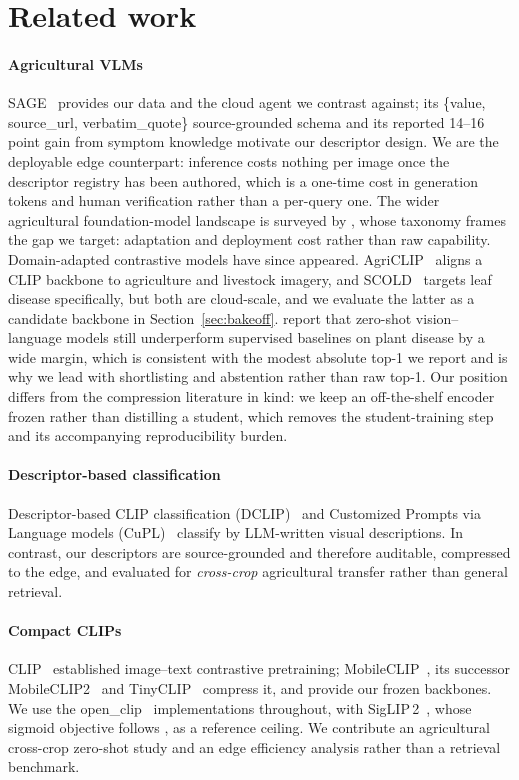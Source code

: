 \documentclass[a4paper,fleqn]{cas-dc}
\begin{document}
\section{Related work}

\paragraph{Agricultural VLMs} SAGE~\citep{arshad2026sage} provides our data and the cloud agent we contrast
against; its
\{value, source\_url, verbatim\_quote\} source-grounded schema and its reported 14--16 point gain from
symptom knowledge motivate our descriptor design. We are the deployable edge counterpart: inference
costs nothing per image once the descriptor registry has been authored, which is a one-time cost in
generation tokens and human verification rather than a per-query one. The wider agricultural
foundation-model landscape is surveyed by \citet{chen2024foundation}, whose taxonomy frames
the gap we target: adaptation and deployment cost rather than raw capability. Domain-adapted
contrastive models have since appeared. AgriCLIP~\citep{nawaz2024agriclip} aligns a CLIP
backbone to agriculture and livestock imagery, and SCOLD~\citep{scold2025} targets leaf
disease specifically, but both are cloud-scale, and we evaluate the latter as a candidate
backbone in Section~\ref{sec:bakeoff}. \citet{lu2025vlmready} report that zero-shot
vision--language models still underperform supervised baselines on plant disease by a wide
margin, which is consistent with the modest absolute top-1 we report and is why we lead with
shortlisting and abstention rather than raw top-1. Our position differs from the compression
literature in kind: we keep an off-the-shelf encoder frozen rather than distilling a student,
which removes the student-training step and its accompanying reproducibility burden.

\paragraph{Descriptor-based classification} Descriptor-based CLIP classification
(DCLIP)~\citep{menon2023} and Customized Prompts via Language models (CuPL)~\citep{pratt2023} classify
by LLM-written visual descriptions. In contrast, our descriptors are source-grounded and therefore auditable,
compressed to the edge, and evaluated for \emph{cross-crop} agricultural transfer rather than general
retrieval.

\paragraph{Compact CLIPs} CLIP~\citep{radford2021} established image--text contrastive pretraining;
MobileCLIP~\citep{vasu2024}, its successor MobileCLIP2~\citep{mobileclip2} and
TinyCLIP~\citep{wu2023} compress it, and provide our frozen backbones. We use the
open\_clip~\citep{ilharco2021} implementations throughout, with SigLIP\,2~\citep{siglip2}, whose
sigmoid objective follows \citet{zhai2023}, as a reference ceiling. We contribute an agricultural cross-crop zero-shot study and an
edge efficiency analysis rather than a retrieval benchmark.
\end{document}
